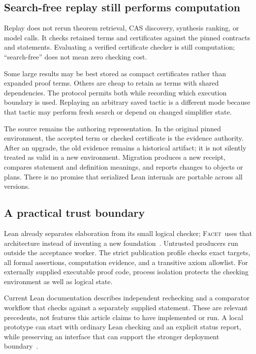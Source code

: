 \documentclass[11pt,a4paper]{article}
\newcommand{\Facet}{\textsc{Facet}}
\theoremstyle{definition}
\begin{document}
\subsection{Search-free replay still performs computation}
Replay does not rerun theorem retrieval, CAS discovery, synthesis ranking, or
model calls. It checks retained terms and certificates against the pinned
contracts and statements. Evaluating a verified certificate checker is still
computation; ``search-free'' does not mean zero checking cost.

Some large results may be best stored as compact certificates rather than
expanded proof terms. Others are cheap to retain as terms with shared dependencies.
The protocol permits both while recording which execution boundary is used.
Replaying an arbitrary saved tactic is a different mode because that tactic may
perform fresh search or depend on changed simplifier state.

The source remains the authoring representation. In the original pinned
environment, the accepted term or checked certificate is the evidence authority.
After an upgrade, the old evidence remains a historical artifact; it is not
silently treated as valid in a new environment. Migration produces a new receipt,
compares statement and definition meanings, and reports changes to objects or
plans. There is no promise that serialized Lean internals are portable across
all versions.

\subsection{A practical trust boundary}
Lean already separates elaboration from its small logical checker; \Facet\ uses
that architecture instead of inventing a new foundation~\cite{lean-elab}.
Untrusted producers run outside the acceptance worker. The strict publication
profile checks exact targets, all formal assertions, computation evidence, and
a transitive axiom allowlist. For externally supplied executable proof code,
process isolation protects the checking environment as well as logical state.

Current Lean documentation describes independent rechecking and a comparator
workflow that checks against a separately supplied statement. These are relevant
precedents, not features this article claims to have implemented or run.
A local prototype can start with ordinary Lean checking and an explicit status
report, while preserving an interface that can support the stronger deployment
boundary~\cite{lean-validation}.
\end{document}
